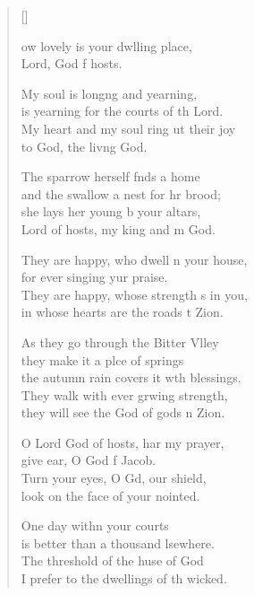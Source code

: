\settowidth{\versewidth}{They are happy, whose strength is in you, *}
\begin{verse}[\versewidth]
  \begin{patverse}
ow lovely is your dwlling place,\Med\\
Lord, God f hosts.

My soul is long\pointup{\i}ng and yearning,\Med\\
is yearning for the courts of th Lord.\\
My heart and my soul ring ut their joy\Med\\
to God, the liv\pointup{\i}ng God.

The sparrow herself f\pointup{\i}nds a home\Med\\
and the swallow a nest for hr brood;\\
she lays her young b your altars,\Med\\
Lord of hosts, my king and m God.

They are happy, who dwell \pointup{\i}n your house,\Med\\
for ever singing yur praise.\\
They are happy, whose strength \pointup{\i}s in you,\Med\\
in whose hearts are the roads t Zion.

As they go through the Bitter Vlley\Flex\\
they make it a plce of springs\Med\\
the autumn rain covers it w\pointup{\i}th blessings.\\
They walk with ever grwing strength,\Med\\
they will see the God of gods \pointup{\i}n Zion.

O Lord God of hosts, har my prayer,\Med\\
give ear, O God f Jacob.\\
Turn your eyes, O Gd, our shield,\Med\\
look on the face of your nointed.

One day with\pointup{\i}n your courts\Med\\
is better than a thousand lsewhere.\\
The threshold of the huse of God\Med\\
I prefer to the dwellings of th wicked.


\end{patverse}
\end{verse}
